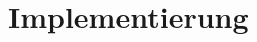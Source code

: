 \documentclass[
   draft=false
  ,paper=a4
  ,twoside=true
  ,fontsize=11pt
  ,headsepline
  ,DIV11
  ,parskip=full+
]{scrartcl} %
\begin{document}
\newpage
\section{Implementierung}
\end{document}
